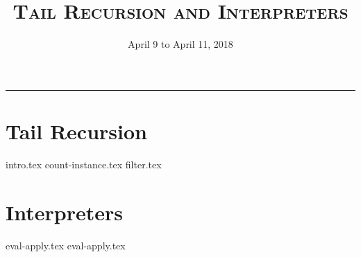 \documentclass{exam}
\title{\textsc{Tail Recursion and Interpreters}}
\date{April 9 to April 11, 2018}
\begin{document}
\maketitle
\rule{\textwidth}{0.15em}
\fontsize{12}{15}\selectfont



\section{Tail Recursion}
\begin{questions}
{intro.tex}
{count-instance.tex}
{filter.tex}
\end{questions}

\section{Interpreters}
\begin{questions}
{eval-apply.tex}
{eval-apply.tex}
\end{questions}

\end{document}
